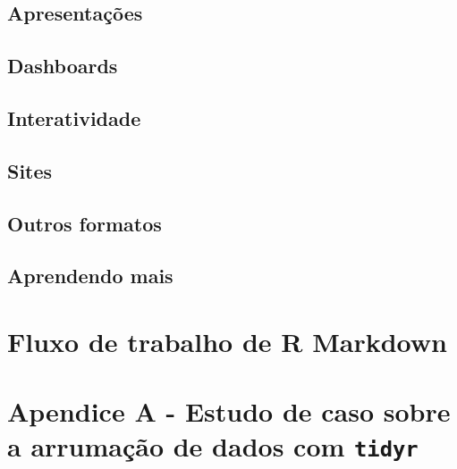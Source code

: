\documentclass[
]{latex/krantz}
\theoremstyle{definition}
\theoremstyle{definition}
\theoremstyle{definition}
\theoremstyle{definition}
\theoremstyle{remark}
\begin{document}
\hypertarget{apresentauxe7uxf5es}{%
\section{Apresentações}\label{apresentauxe7uxf5es}}

\hypertarget{dashboards}{%
\section{Dashboards}\label{dashboards}}

\hypertarget{interatividade}{%
\section{Interatividade}\label{interatividade}}

\hypertarget{sites}{%
\section{Sites}\label{sites}}

\hypertarget{outros-formatos}{%
\section{Outros formatos}\label{outros-formatos}}

\hypertarget{aprendendo-mais-3}{%
\section{Aprendendo mais}\label{aprendendo-mais-3}}

\hypertarget{fluxo-de-trabalho-de-r-markdown}{%
\chapter{Fluxo de trabalho de R Markdown}\label{fluxo-de-trabalho-de-r-markdown}}

\hypertarget{appendix-apuxe9ndices}{%
\appendix {}}


\hypertarget{apendice-a---estudo-de-caso-sobre-a-arrumauxe7uxe3o-de-dados-com-tidyr}{%
\chapter{\texorpdfstring{Apendice A - Estudo de caso sobre a arrumação de dados com \texttt{tidyr}}{Apendice A - Estudo de caso sobre a arrumação de dados com tidyr}}\label{apendice-a---estudo-de-caso-sobre-a-arrumauxe7uxe3o-de-dados-com-tidyr}}
\end{document}

